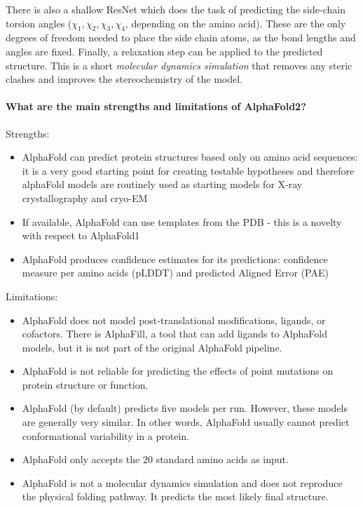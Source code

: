 \smallskip \noindent
There is also a shallow ResNet which does the task of predicting the side-chain torsion angles ($\chi_1,\chi_2,\chi_3,\chi_4$, depending on the amino acid). These are the only degrees of freedom needed to place the side chain atoms, as the bond lengths and angles are fixed. 
Finally, a relaxation step can be applied to the predicted structure. This is a short \textit{molecular dynamics simulation} that removes any steric clashes and improves the stereochemistry of the model. 




\paragraph{What are the main strengths and limitations of AlphaFold2?}

Strengths:
\begin{itemize}
\item AlphaFold can predict protein structures based only on amino acid sequences:  it is a very good starting point for creating testable hypotheses
and therefore alphaFold models are routinely used as starting models for X-ray crystallography and cryo-EM
\item If available, AlphaFold can use templates from the PDB - this is a novelty with respect to AlphaFold1
\item AlphaFold produces confidence estimates for its predictions: confidence measure per amino acids (pLDDT) and predicted Aligned Error (PAE)
\end{itemize}
Limitations:
\begin{itemize}
\item AlphaFold does not model post-translational modifications, ligands, or cofactors. There is AlphaFill, a tool that can add ligands to AlphaFold models, but it is not part of the original AlphaFold pipeline.
\item AlphaFold is not reliable for predicting the effects of point mutations on protein structure or function.
\item AlphaFold (by default) predicts five models per run. However, these models are generally
very similar. In other words, AlphaFold usually cannot predict conformational variability in a
protein.
\item AlphaFold only accepts the $20$ standard amino acids as input.
\item  AlphaFold is not a molecular dynamics simulation and does not reproduce the physical folding pathway. It predicts the most likely final structure.
\end{itemize}



